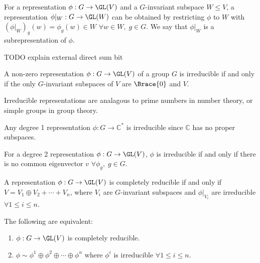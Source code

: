 \begin{defi}
	For a representation $\phi : G \to \GL(V)$ and a $G$-invariant subspace $W \leqslant V$, a representation $\phi\vert_W : G \to \GL(W)$ can be obtained by restricting $\phi$ to $W$ with $(\phi\vert_W)_g(w) = \phi_g(w) \in W$ $\forall w \in W,\;g \in G$. We say that $\phi\vert_W$ is a subrepresentation of $\phi$.
\end{defi}
TODO explain external direct sum bit

\begin{defi}
	A non-zero representation $\phi : G \to \GL(V)$ of a group $G$ is irreducible if and only if the only $G$-invariant subspaces of $V$ are $\Brace{0}$ and $V$.
\end{defi}

Irreducible representations are analagous to prime numbers in number theory, or simple groups in group theory. 

\begin{lemm}
	Any degree 1 representation $\phi : G \to \mathbb{C}^*$ is irreducible since $\mathbb{C}$ has no proper subspaces.
\end{lemm}

\begin{prop}
	For a degree 2 representation $\phi : G \to \GL(V)$, $\phi$ is irreducible if and only if there is no common eigenvector $v$ $\forall \phi_g,\;g \in G$.
\end{prop}

\begin{defi}
	A representation $\phi : G \to \GL(V)$ is completely reducible if and only if $V = V_1 \oplus V_2 + \cdots + V_n$, where $V_i$ are $G$-invariant subspaces and $\phi\vert_{V_i}$ are irreducible $\forall 1 \leqslant i \leqslant n$.
\end{defi}

\begin{prop}
	The following are equivalent:
	\begin{enumerate}
		\item $\phi : G \to \GL(V)$ is completely reducible.
		\item $\phi \sim \phi^1 \oplus \phi^2 \oplus \cdots \oplus \phi^n$ where $\phi^i$ is irreducible $\forall 1 \leqslant i \leqslant n$.
	\end{enumerate}
\end{prop}

